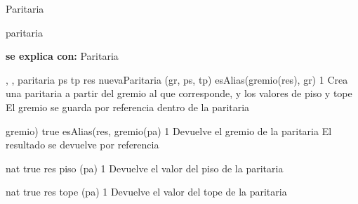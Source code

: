 \begin{interfaz}{Paritaria}

\begin{iparamformales}{paritaria}

\textbf{\large se explica con:} Paritaria

\end{iparamformales}

{, , }{paritaria}
{ps \menorigual tp}
{res \igobs nuevaParitaria (gr, ps, tp)  \ly esAlias(gremio(res), gr) }
{1}
{Crea una paritaria a partir del gremio al que corresponde, y los valores de piso y tope}
{El gremio se guarda por referencia dentro de la paritaria}

{}{gremio)}
{true}
{esAlias(res, gremio(pa)  }
{1}
{Devuelve el gremio de la paritaria}
{El resultado se devuelve por referencia}

{}{nat}
{true}
{res \igobs piso (pa)}
{1}
{Devuelve el valor del piso de la paritaria}
{}

{}{nat}
{true}
{res \igobs tope (pa)}
{1}
{Devuelve el valor del tope de la paritaria}
{}

\end{interfaz}